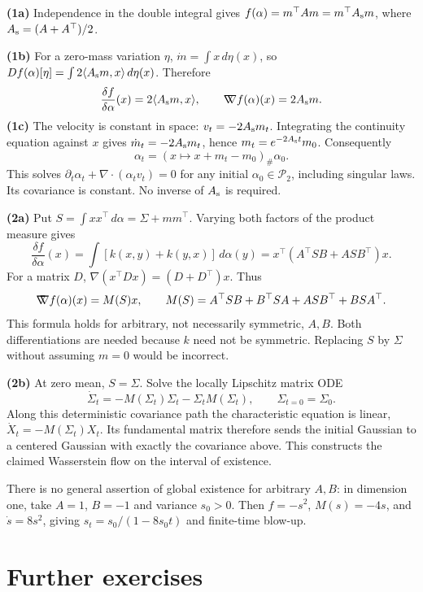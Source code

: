 \documentclass[11pt,a4paper]{article}
\theoremstyle{exostyle}
\newcommand{\gradW}{\mathord{\nabla\mkern-9.3mu\nabla}}
\begin{document}
\begin{solution}
\textbf{(1a)} Independence in the double integral gives $f(\alpha)=m^\top A m=m^\top A_{\rm s}m$, where $A_{\rm s}=(A+A^\top)/2$.

\textbf{(1b)} For a zero-mass variation $\eta$, $\dot m=\int x\,d\eta(x)$, so
$Df(\alpha)[\eta]=\int2\langle A_{\rm s}m,x\rangle\,d\eta(x)$. Therefore
\[
\frac{\delta f}{\delta\alpha}(x)=2\langle A_{\rm s}m,x\rangle,\qquad
\gradW f(\alpha)(x)=2A_{\rm s}m.
\]
\textbf{(1c)} The velocity is constant in space: $v_t=-2A_{\rm s}m_t$. Integrating the continuity equation against $x$ gives $\dot m_t=-2A_{\rm s}m_t$, hence $m_t=e^{-2A_{\rm s}t}m_0$. Consequently
\[
\alpha_t=(x\mapsto x+m_t-m_0)_\#\alpha_0.
\]
This solves $\partial_t\alpha_t+\nabla\cdot(\alpha_t v_t)=0$ for any initial $\alpha_0\in\mathcal P_2$, including singular laws. Its covariance is constant. No inverse of $A_{\rm s}$ is required.

\textbf{(2a)} Put $S=\int xx^\top\,d\alpha=\Sigma+mm^\top$. Varying both factors of the product measure gives
\[
\frac{\delta f}{\delta\alpha}(x)=\int[k(x,y)+k(y,x)]\,d\alpha(y)
=x^\top(A^\top SB+ASB^\top)x.
\]
For a matrix $D$, $\nabla(x^\top D x)=(D+D^\top)x$. Thus
\[
\gradW f(\alpha)(x)=M(S)x,\qquad
M(S)=A^\top SB+B^\top SA+ASB^\top+BS A^\top.
\]
This formula holds for arbitrary, not necessarily symmetric, $A,B$. Both differentiations are needed because $k$ need not be symmetric. Replacing $S$ by $\Sigma$ without assuming $m=0$ would be incorrect.

\textbf{(2b)} At zero mean, $S=\Sigma$. Solve the locally Lipschitz matrix ODE
\[
\dot\Sigma_t=-M(\Sigma_t)\Sigma_t-\Sigma_tM(\Sigma_t),\qquad \Sigma_{t=0}=\Sigma_0.
\]
Along this deterministic covariance path the characteristic equation is linear, $\dot X_t=-M(\Sigma_t)X_t$. Its fundamental matrix therefore sends the initial Gaussian to a centered Gaussian with exactly the covariance above. This constructs the claimed Wasserstein flow on the interval of existence.

There is no general assertion of global existence for arbitrary $A,B$: in dimension one, take $A=1$, $B=-1$ and variance $s_0>0$. Then $f=-s^2$, $M(s)=-4s$, and $\dot s=8s^2$, giving $s_t=s_0/(1-8s_0t)$ and finite-time blow-up.
\end{solution}

\section*{Further exercises}
\end{document}
